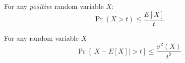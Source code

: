 \documentclass{article}
\begin{document}



\begin{fact}%
For any {\it positive} random variable $X$:
\begin{equation}
\Pr(X > t) \le \frac{E[X]}{t}
\end{equation}
\end{fact}

\begin{fact}%
For any random variable $X$
\begin{equation}
\Pr[|X-E[X]| > t] \le \frac{\sigma^2(X)}{t^2}
\end{equation}
\end{fact}
\end{document}
